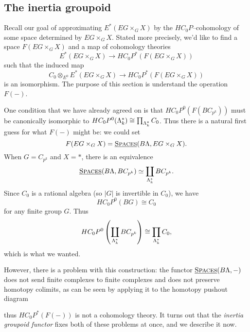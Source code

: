 \subsection*{The inertia groupoid}

Recall our goal of approximating \(E^*(EG \times_G X)\) by the \(HC_0P\)--cohomology of some space determined by \(EG \times_G X\). Stated more precisely, we'd like to find a space \(F(EG \times_G X)\) and a map of cohomology theories
\[
E^*(EG \times_G X) \to HC_0P^*(F(EG \times_G X))
\]
such that the induced map
\[
C_0 \otimes_{E^0} E^*(EG \times_G X) \to HC_0P^*(F(EG \times_G X))
\]
is an isomorphism. The purpose of this section is understand the operation \(F(-)\). 

One condition that we have already agreed on is that \(HC_0P^0(F(BC_{p^k}))\) must be canonically isomorphic to \(HC_0P^0(\Lambda_k^*) \cong \prod_{\Lambda_k^*}C_0\). Thus there is a natural first guess for what \(F(-)\) might be: we could set 
\[
F(EG \times_G X) = \operatorname{\underline{\smash{\normalfont\textsc{Spaces}}}}(B\Lambda, EG \times_G X).
\]
When \(G = C_{p^k}\) and \(X = *\), there is an equivalence
\[
\operatorname{\underline{\smash{\normalfont\textsc{Spaces}}}}(B\Lambda, BC_{p^k}) \simeq \coprod_{\Lambda_k^*} BC_{p^k}.
\]
Since \(C_0\) is a rational algebra (so \(|G|\) is invertible in \(C_0\)), we have 
\[
HC_0P^0(BG) \cong C_0
\]
for any finite group \(G\). Thus
\[
HC_0P^0\left(\coprod_{\Lambda_k^*} BC_{p^k}\right) \cong \prod_{\Lambda_k^*}C_0,
\]
which is what we wanted.

However, there is a problem with this construction: the functor \(\operatorname{\underline{\smash{\normalfont\textsc{Spaces}}}}(B\Lambda,-)\) does not send finite complexes to finite complexes and does not preserve homotopy colimits, as can be seen by applying it to the homotopy pushout diagram
\begin{center}
\end{center}
thus \(HC_0P^*(F(-))\) is not a cohomology theory.  It turns out that the \textit{inertia groupoid functor} fixes both of these problems at once, and we describe it now.

%

